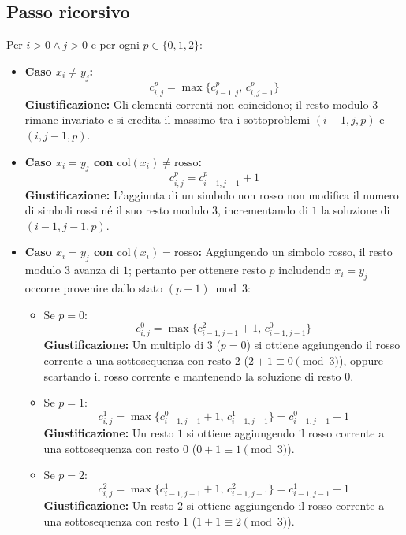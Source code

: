 \subsection{Passo ricorsivo}
Per $i > 0 \land j > 0$ e per ogni $p \in \{0, 1, 2\}$:
\begin{itemize}
    \item \textbf{Caso $x_i \neq y_j$:}
    \[
        c_{i,j}^p = \max \{ c_{i-1, j}^p, \, c_{i, j-1}^p \}
    \]
    \textbf{Giustificazione:} Gli elementi correnti non coincidono; il resto modulo $3$ rimane invariato e si eredita il massimo tra i sottoproblemi $(i-1, j, p)$ e $(i, j-1, p)$.

    \item \textbf{Caso $x_i = y_j$ con $\text{col}(x_i) \neq \text{rosso}$:}
    \[
        c_{i,j}^p = c_{i-1, j-1}^p + 1
    \]
    \textbf{Giustificazione:} L'aggiunta di un simbolo non rosso non modifica il numero di simboli rossi né il suo resto modulo $3$, incrementando di $1$ la soluzione di $(i-1, j-1, p)$.

    \item \textbf{Caso $x_i = y_j$ con $\text{col}(x_i) = \text{rosso}$:}
    Aggiungendo un simbolo rosso, il resto modulo $3$ avanza di $1$; pertanto per ottenere resto $p$ includendo $x_i = y_j$ occorre provenire dallo stato $(p - 1) \bmod 3$:
    \begin{itemize}
        \item Se $p = 0$:
        \[
            c_{i,j}^0 = \max \{ c_{i-1, j-1}^2 + 1, \, c_{i-1, j-1}^0 \}
        \]
        \textbf{Giustificazione:} Un multiplo di $3$ ($p=0$) si ottiene aggiungendo il rosso corrente a una sottosequenza con resto $2$ ($2 + 1 \equiv 0 \pmod 3$), oppure scartando il rosso corrente e mantenendo la soluzione di resto $0$.
        \item Se $p = 1$:
        \[
            c_{i,j}^1 = \max \{ c_{i-1, j-1}^0 + 1, \, c_{i-1, j-1}^1 \} = c_{i-1, j-1}^0 + 1
        \]
        \textbf{Giustificazione:} Un resto $1$ si ottiene aggiungendo il rosso corrente a una sottosequenza con resto $0$ ($0 + 1 \equiv 1 \pmod 3$).
        \item Se $p = 2$:
        \[
            c_{i,j}^2 = \max \{ c_{i-1, j-1}^1 + 1, \, c_{i-1, j-1}^2 \} = c_{i-1, j-1}^1 + 1
        \]
        \textbf{Giustificazione:} Un resto $2$ si ottiene aggiungendo il rosso corrente a una sottosequenza con resto $1$ ($1 + 1 \equiv 2 \pmod 3$).
    \end{itemize}
\end{itemize}

